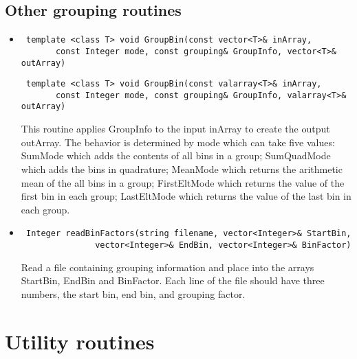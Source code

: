 \documentclass[11pt]{book}
\begin{document}
\subsection{Other grouping routines}

\begin{itemize}

\item  \begin{verbatim} template <class T> void GroupBin(const vector<T>& inArray, 
       const Integer mode, const grouping& GroupInfo, vector<T>& outArray) \end{verbatim}
       \begin{verbatim} template <class T> void GroupBin(const valarray<T>& inArray, 
       const Integer mode, const grouping& GroupInfo, valarray<T>& outArray) \end{verbatim}

          This routine applies GroupInfo to the input inArray to
          create the output outArray. The behavior is determined by
          mode which can take five values: SumMode which adds the
          contents of all bins in a group; SumQuadMode which adds the
          bins in quadrature; MeanMode which returns the arithmetic
          mean of the all bins in a group; FirstEltMode which returns
          the value of the first bin in each group; LastEltMode which
          returns the value of the last bin in each group.

\item  \begin{verbatim} Integer readBinFactors(string filename, vector<Integer>& StartBin, 
               vector<Integer>& EndBin, vector<Integer>& BinFactor) \end{verbatim}

          Read a file containing grouping information and place into
          the arrays StartBin, EndBin and BinFactor. Each line of
          the file should have three numbers, the start bin, end bin, and
          grouping factor.

\end{itemize}

\section{Utility routines}
\end{document}
